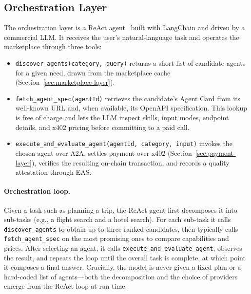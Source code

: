 \documentclass[sigconf]{acmart}
\begin{document}
\subsection{Orchestration Layer}
\label{sec:orchestration-layer}

The orchestration layer is a ReAct agent~\cite{yao2023react} built with
LangChain and driven by a commercial LLM. It receives the user's
natural-language task and operates the marketplace through three tools:

\begin{sloppypar}
\begin{itemize}
  \item \texttt{discover\_agents(category, query)} returns a short list
    of candidate agents for a given need, drawn from the marketplace
    cache (Section~\ref{sec:marketplace-layer}).
  \item \texttt{fetch\_agent\_spec(agentId)} retrieves the candidate's
    Agent Card from its well-known URL and, when available, its OpenAPI
    specification. This lookup is free of charge and lets the LLM
    inspect skills, input modes, endpoint details, and x402 pricing
    before committing to a paid call.
  \item \texttt{execute\_and\_evaluate\_agent(agentId, category,
    input)} invokes the chosen agent over A2A, settles payment over
    x402 (Section~\ref{sec:payment-layer}), verifies the resulting
    on-chain transaction, and records a quality attestation through EAS.
\end{itemize}
\end{sloppypar}

\paragraph{Orchestration loop.}
Given a task such as planning a trip, the ReAct agent first decomposes
it into sub-tasks (e.g., a flight search and a hotel search). For each
sub-task it calls \texttt{discover\_agents} to obtain up to three ranked
candidates, then typically calls \texttt{fetch\_agent\_spec} on the most
promising ones to compare capabilities and prices. After selecting an
agent, it calls \texttt{execute\_and\_evaluate\_agent}, observes the
result, and repeats the loop until the overall task is complete, at which
point it composes a final answer. Crucially, the model is never given a fixed
plan or a hard-coded list of agents---both the decomposition and the
choice of providers emerge from the ReAct loop at run time.
\end{document}
